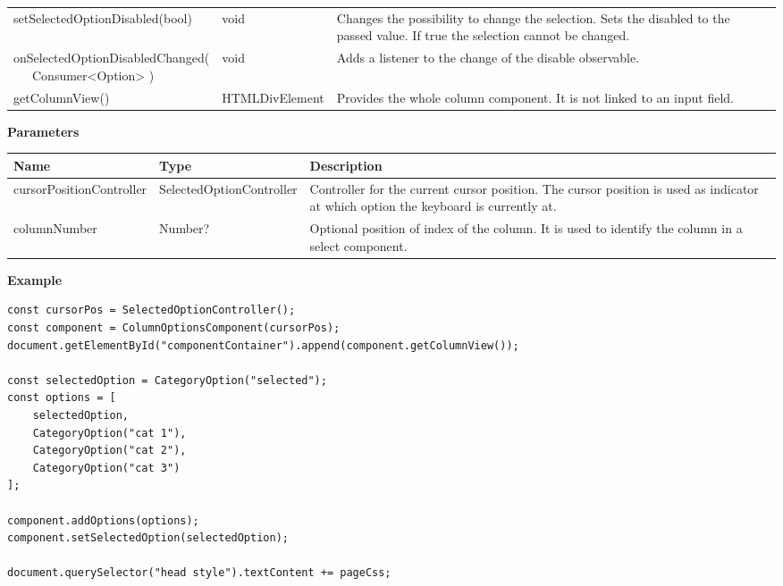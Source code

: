 \begin{table}[!htb]
\begin{tabular}{ p{5cm} p{3cm} p{4.5cm} }
        setSelectedOptionDisabled(bool)     & void           & Changes the possibility to change the selection. 
                                                               Sets the disabled to the passed value. 
                                                               If true the selection cannot be changed. \\
        \tbbr{
            onSelectedOptionDisabledChanged( \\
                \ \ \ Consumer<Option>
            )}                              & void           & Adds a listener to the change of the disable observable. \\
        getColumnView()                     & HTMLDivElement & Provides the whole column component. 
                                                               It is not linked to an input field. \\
        \bottomrule[1.2pt]
    \end{tabular}
\end{table}

\vspace*{6pt}
\noindent
\textbf{Parameters}

\begin{table}[!htb] 
    \label{api:columnOptionsComponentParameter}
    \footnotesize
    \setlength\extrarowheight{4pt}
    \begin{tabular}{ p{3.2cm} p{4.2cm} p{5.1cm} }
        \toprule[1.2pt]
        \textbf{Name}            & \textbf{Type}            & \textbf{Description} \\
        \midrule
        cursorPositionController & SelectedOptionController & Controller for the current cursor position. 
                                                              The cursor position is used as indicator at which option the keyboard is currently at. \\
        columnNumber             & Number?                  & Optional position of index of the column. 
                                                              It is used to identify the column in a select component. \\
        \bottomrule[1.2pt]
    \end{tabular}
\end{table}

\vspace*{6pt}
\noindent
\textbf{Example}

\begin{lstlisting}[style = htmlcssjs, label = api:columnOptionsComponentExample]
const cursorPos = SelectedOptionController();
const component = ColumnOptionsComponent(cursorPos);
document.getElementById("componentContainer").append(component.getColumnView());

const selectedOption = CategoryOption("selected");
const options = [ 
    selectedOption,
    CategoryOption("cat 1"),
    CategoryOption("cat 2"),
    CategoryOption("cat 3") 
];

component.addOptions(options);
component.setSelectedOption(selectedOption);

document.querySelector("head style").textContent += pageCss;
\end{lstlisting}

